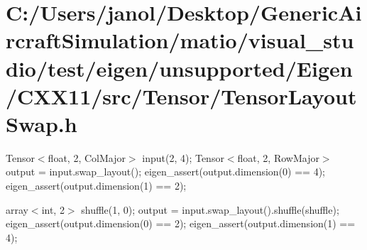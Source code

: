 \hypertarget{_c_1_2_users_2janol_2_desktop_2_generic_aircraft_simulation_2matio_2visual_studio_2test_2eigen_2286551beec45c5254494adb391cdc80f}{}\section{C\+:/\+Users/janol/\+Desktop/\+Generic\+Aircraft\+Simulation/matio/visual\+\_\+studio/test/eigen/unsupported/\+Eigen/\+C\+X\+X11/src/\+Tensor/\+Tensor\+Layout\+Swap.\+h}
Tensor$<$float, 2, Col\+Major$>$ input(2, 4); Tensor$<$float, 2, Row\+Major$>$ output = input.\+swap\+\_\+layout(); eigen\+\_\+assert(output.\+dimension(0) == 4); eigen\+\_\+assert(output.\+dimension(1) == 2);

array$<$int, 2$>$ shuffle(1, 0); output = input.\+swap\+\_\+layout().shuffle(shuffle); eigen\+\_\+assert(output.\+dimension(0) == 2); eigen\+\_\+assert(output.\+dimension(1) == 4);


